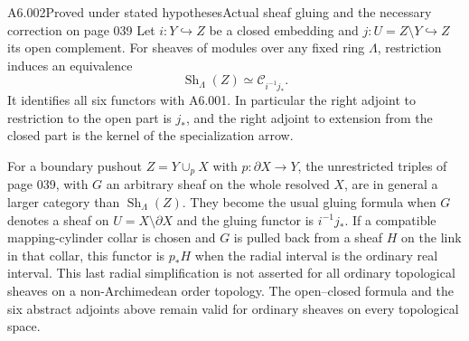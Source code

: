 \begin{saresult}{A6.002}{Proved under stated hypotheses}{Actual sheaf gluing and the necessary correction on page 039}
Let $i:Y\hookrightarrow Z$ be a closed embedding and
$j:U=Z\setminus Y\hookrightarrow Z$ its open complement. For sheaves
of modules over any fixed ring $\Lambda$, restriction induces an
equivalence
\[
\operatorname{Sh}_\Lambda(Z)\simeq
\mathcal C_{i^{-1}j_*}.
\]
It identifies all six functors with A6.001. In particular the right
adjoint to restriction to the open part is $j_*$, and the right
adjoint to extension from the closed part is the kernel of the
specialization arrow.

For a boundary pushout $Z=Y\cup_pX$ with $p:\partial X\to Y$,
the unrestricted triples of page 039, with $G$ an arbitrary sheaf on
the whole resolved $X$, are in general a larger category than
$\operatorname{Sh}_\Lambda(Z)$. They become the usual gluing formula
when $G$ denotes a sheaf on $U=X\setminus\partial X$ and the gluing
functor is $i^{-1}j_*$. If a compatible mapping-cylinder collar is
chosen and $G$ is pulled back from a sheaf $H$ on the link in that
collar, this functor is $p_*H$ when the radial interval is the ordinary
real interval. This last radial simplification is not asserted for
all ordinary topological sheaves on a non-Archimedean order topology.
The open--closed formula and the six abstract adjoints above remain
valid for ordinary sheaves on every topological space.
\end{saresult}
